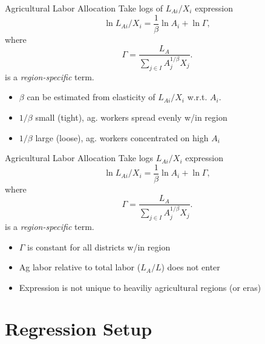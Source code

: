 \documentclass[10pt, xcolor=dvipsnames]{beamer}
\begin{document}
\begin{frame}{Agricultural Labor Allocation}
Take logs of $L_{Ai}/X_i$ expression
\begin{equation}
\ln L_{Ai}/X_i = \frac{1}{\beta} \ln A_{i} + \ln \Gamma, \label{EQ_est}
\end{equation}
where
\begin{equation}
    \Gamma = \frac{L_A}{\sum_{j\in I} A_{j}^{1/\beta}X_{j}}.
\end{equation}
is a \textit{region-specific} term. 

\begin{itemize}
  \item $\beta$ can be estimated from elasticity of $L_{Ai}/X_i$ w.r.t. $A_i$. 
  \item $1/\beta$ small (tight), ag. workers spread evenly w/in region
  \item $1/\beta$ large (loose), ag. workers concentrated on high $A_i$
\end{itemize}
\end{frame}

\begin{frame}{Agricultural Labor Allocation}\label{model}
Take logs $L_{Ai}/X_i$ expression
\begin{equation}
\ln L_{Ai}/X_i = \frac{1}{\beta} \ln A_{i} + \ln \Gamma, \label{EQ_est}
\end{equation}
where
\begin{equation}
    \Gamma = \frac{L_A}{\sum_{j\in I} A_{j}^{1/\beta}X_{j}}.
\end{equation}
is a \textit{region-specific} term. 

\begin{itemize}
  \item $\Gamma$ is constant for all districts w/in region
  \item Ag labor relative to total labor ($L_A/L$) does not enter
  \item Expression is not unique to heaviliy agricultural regions (or eras)
\end{itemize}

\hfill \hyperlink{extend}{}
\end{frame}

\section{Regression Setup}
\end{document}
